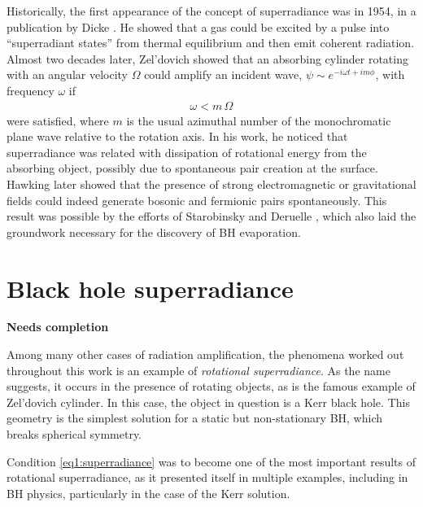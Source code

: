 Historically, the first appearance of the concept of superradiance was in 1954, in a publication by Dicke \cite{Dicke1954}.
He showed that a gas could be excited by a pulse into ``superradiant states'' from thermal equilibrium and then emit coherent radiation.
Almost two decades later, Zel'dovich \cite{Zeldovich1971,Zeldovich1972} showed that an absorbing cylinder rotating with an angular velocity $\Omega$ could amplify an incident wave, $\psi \sim e^{-i \omega t + i m \phi}$, with frequency $\omega$ if
\begin{align}
    \omega < m\, \Omega
    \label{eq1:superradiance}
\end{align}
were satisfied, where $m$ is the usual azimuthal number of the monochromatic plane wave relative to the rotation axis.
In his work, he noticed that superradiance was related with dissipation of rotational energy from the absorbing object, possibly due to spontaneous pair creation at the surface. 
Hawking later showed that the presence of strong electromagnetic or gravitational fields could indeed generate bosonic and fermionic pairs spontaneously.
This result was possible by the efforts of Starobinsky and Deruelle \cite{Starobinsky1973a,Starobinsky1973b,Deruelle1974,Deruelle1975}, which also laid the groundwork necessary for the discovery of BH evaporation.


\section{Black hole superradiance}

\textbf{Needs completion}

Among many other cases of radiation amplification, the phenomena worked out throughout this work is an example of \emph{rotational superradiance}. 
As the name suggests, it occurs in the presence of rotating objects, as is the famous example of Zel'dovich cylinder. In this case, the object in question is a Kerr black hole. 
This geometry is the simplest solution for a static but non-stationary BH, which breaks spherical symmetry.

Condition \eqref{eq1:superradiance} was to become one of the most important results of rotational superradiance, as it presented itself in multiple examples, including in BH physics, particularly in the case of the Kerr solution.


